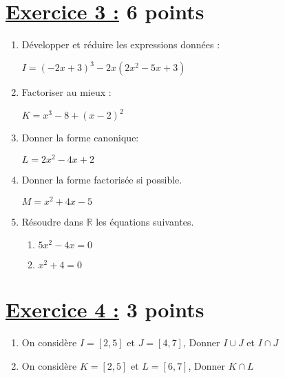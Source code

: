 \documentclass[12pt,a4paper]{article}
\begin{document}
\section*{\underline{Exercice 3 :} 6 points}
\begin{enumerate}
\item Développer et réduire les expressions données :

 \( I = (-2x + 3)^3 - 2x(2x^2 - 5x + 3) \)

\item Factoriser au mieux :

\( K = x^3 - 8 + (x - 2)^2 \)

\item Donner la forme canonique:

$L=2x^{2}-4x+2$

\item Donner la forme factorisée si possible.

$M=x^{2}+4x-5$

\item Résoudre dans $\mathbb{R}$ les équations suivantes.
\begin{enumerate}
\item $5x^{2}-4x = 0$
\item $x^{2}+4 = 0$
\end{enumerate}
\end{enumerate}

\section*{\underline{Exercice 4 :} 3 points}
\begin{enumerate}
\item On considère $I = [2, 5]$ et $J = [4, 7]$, Donner $I \cup J$ et $I \cap J$

\item On considère $K = [2, 5]$ et $L = [6, 7]$, Donner $K \cap L$
\end{enumerate}
\end{document}
